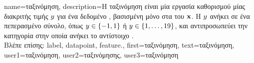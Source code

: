 {name={\foreignlanguage{greek}{ταξινόμηση}},
	description={\foreignlanguage{greek}{Η ταξινόμηση είναι μία εργασία καθορισμού} 
 		\foreignlanguage{greek}{μίας}  \foreignlanguage{greek}{διακριτής τιμής} $y$ 
		\foreignlanguage{greek}{για ένα δεδομένο} , \foreignlanguage{greek}{βασισμένη μόνο στα}  
 		 \foreignlanguage{greek}{του} ${\bf x}$. \foreignlanguage{greek}{Η}  $y$ 
		\foreignlanguage{greek}{ανήκει σε ένα πεπερασμένο σύνολο, όπως  
 		$y \in \{-1,1\}$ ή $y \in \{1,\ldots,19\}$, και αντιπροσωπεύει την κατηγορία στην οποία ανήκει το  
 		αντίστοιχο} .\\
	\foreignlanguage{greek}{Βλέπε επίσης:} \gls{label}, \gls{datapoint}, \gls{feature}.},
	first={\foreignlanguage{greek}{ταξινόμηση}},
	text={\foreignlanguage{greek}{ταξινόμηση}},
	user1={\foreignlanguage{greek}{ταξινόμηση}}, %
	user2={\foreignlanguage{greek}{ταξινόμησης}}, %
	user3={\foreignlanguage{greek}{ταξινόμηση}} %
}


